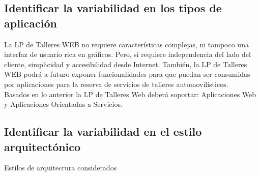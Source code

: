 \documentclass[10pt,a4paper,openany]{book}
\begin{document}
\subsection{Identificar la variabilidad en los tipos de aplicación}
La LP de Talleres WEB no requiere características complejas, ni tampoco una interfaz de usuario rica en gráficos. Pero, si requiere independencia del lado del cliente, simplicidad y accesibilidad desde Internet. También, la LP de Talleres WEB podrá a futuro exponer funcionalidades para que puedan ser consumidas por aplicaciones para la reserva de servicios de talleres automovilísticos.\\

Basados en lo anterior la LP de Talleres Web deberá soportar: Aplicaciones Web y Aplicaciones Orientadas a Servicios.


\subsection{Identificar la variabilidad en el estilo arquitectónico}
Estilos de arquitecrura considerados \cite{url3}
\end{document}
